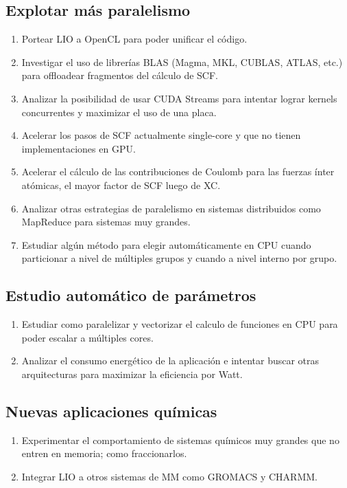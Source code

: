 \subsection{Explotar m\'as paralelismo}
\begin{enumerate}
  \item Portear LIO a OpenCL para poder unificar el c\'odigo.
  \item Investigar el uso de librer\'ias BLAS (Magma, MKL, CUBLAS, ATLAS, etc.) para offloadear fragmentos del
    c\'alculo de SCF.
  \item Analizar la posibilidad de usar CUDA Streams para intentar lograr kernels concurrentes y maximizar
    el uso de una placa.
  \item Acelerar los pasos de SCF actualmente single-core y que no tienen implementaciones en GPU.
  \item Acelerar el c\'alculo de las contribuciones de Coulomb para las fuerzas \'inter at\'omicas, el mayor factor de SCF luego de XC.
  \item Analizar otras estrategias de paralelismo en sistemas distribuidos como MapReduce para sistemas muy grandes.
  \item Estudiar alg\'un m\'etodo para elegir autom\'aticamente en CPU cuando particionar a nivel
    de m\'ultiples grupos y cuando a nivel interno por grupo.
\end{enumerate}

\subsection{Estudio autom\'atico de par\'ametros}
\begin{enumerate}
  \item Estudiar como paralelizar y vectorizar el calculo de funciones en CPU para poder escalar a m\'ultiples cores.
  \item Analizar el consumo energ\'etico de la aplicaci\'on e intentar buscar otras arquitecturas para maximizar
    la eficiencia por Watt.
\end{enumerate}

\subsection{Nuevas aplicaciones qu\'imicas}
\begin{enumerate}
  \item Experimentar el comportamiento de sistemas qu\'imicos muy grandes que no entren en memoria; como fraccionarlos.
  \item Integrar LIO a otros sistemas de MM como GROMACS y CHARMM.
\end{enumerate}

